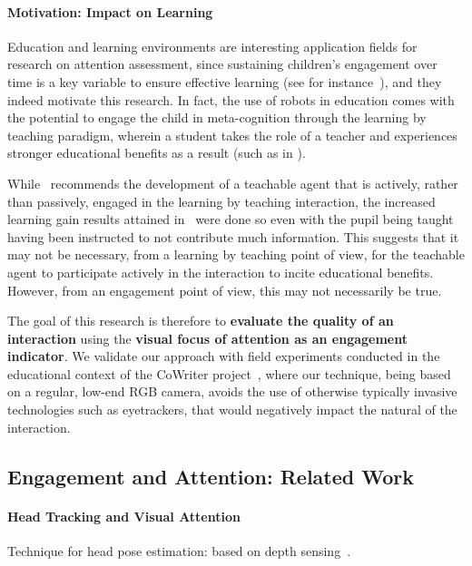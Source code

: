 \documentclass{sig-alternate}
\begin{document}
\paragraph{Motivation: Impact on Learning}

Education and learning environments are interesting application fields for
research on attention assessment, since sustaining children's engagement over
time is a key variable to ensure effective learning (see for
instance~\cite{Umbach}), and they indeed motivate this research. In fact, the
use of robots in education comes with the potential to engage the child in
meta-cognition through the learning by teaching paradigm, wherein a student
takes the role of a teacher and experiences stronger educational benefits as a
result (such as in \cite{Palinscar1984}).

While~\cite{zhao2012learning} recommends the development of a teachable agent
that is actively, rather than passively, engaged in the learning by teaching
interaction, the increased learning gain results attained
in~\cite{okita2006observation} were done so even with the pupil being taught
having been instructed to not contribute much information. This suggests that it
may not be necessary, from a learning by teaching point of view, for the
teachable agent to participate actively in the interaction to incite educational
benefits. However, from an engagement point of view, this may not necessarily be
true.

The goal of this research is therefore to \textbf{evaluate the quality of an
interaction} using the \textbf{visual focus of attention as an engagement
indicator}. We validate our approach with field experiments conducted in the
educational context of the CoWriter project~\cite{Hood:2015}, where our
technique, being based on a regular, low-end RGB camera, avoids the use of
otherwise typically invasive technologies such as eyetrackers, that would
negatively impact the natural of the interaction.

\subsection*{Engagement and Attention: Related Work}

\paragraph{Head Tracking and Visual Attention}

Technique for head pose estimation: based on depth
sensing~\cite{fanelli2012real}.
\end{document}
